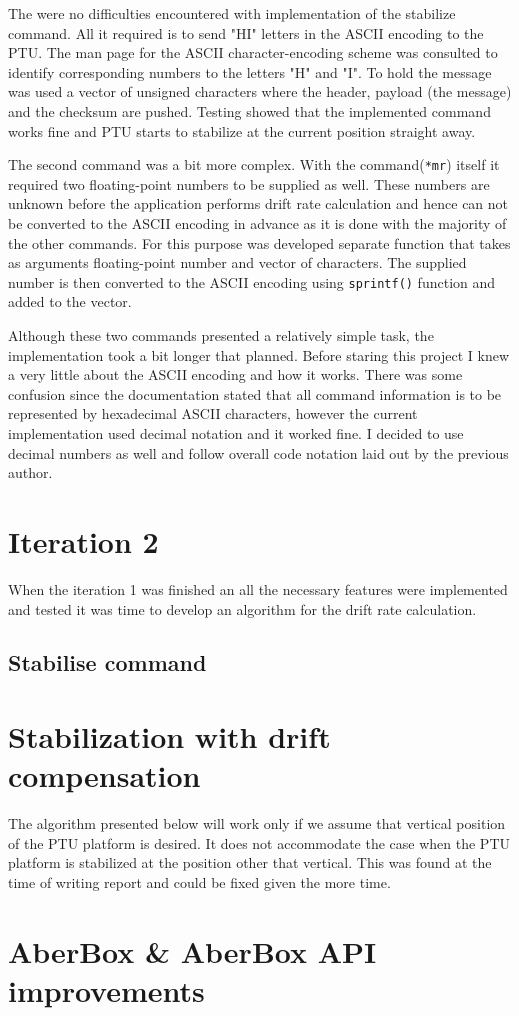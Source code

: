 The were no difficulties encountered with implementation of the stabilize command. All it required is to send "HI" letters in the ASCII encoding to the PTU. The man page for the ASCII character-encoding scheme was consulted to identify corresponding numbers to the letters "H" and "I". To hold the message was used a vector of unsigned characters where the header, payload (the message) and the checksum are pushed. Testing showed that the implemented command works fine and PTU starts to stabilize at the current position straight away. 

The second command was a bit more complex. With the command(\texttt{*mr}) itself it required two floating-point numbers to be supplied as well. These numbers are unknown before the application performs drift rate calculation and hence can not be converted to the ASCII encoding in advance as it is done with the majority of the other commands. For this purpose was developed separate function that takes as arguments floating-point number and vector of characters. The supplied number is then converted to the ASCII encoding using \texttt{sprintf()} function and added to the vector. 

Although these two commands presented a relatively simple task, the implementation took a bit longer that planned. Before staring this project I knew a very little about the ASCII encoding and how it works. There was some confusion since the documentation stated that all command information is to be represented by hexadecimal ASCII characters, however the current implementation used decimal notation and it worked fine. I decided to use decimal numbers as well and follow overall code notation laid out by the previous author.   
 
\section{Iteration 2}
When the iteration 1 was finished an all the necessary features were implemented and tested it was time to develop an algorithm for the drift rate calculation.
\subsection{Stabilise command}
\label{stabilize_implementation}
 
 
 
 \section{Stabilization with drift compensation}
 
 The algorithm presented below will work only if we assume that vertical position of the PTU platform is desired. It does not accommodate the case when the PTU  platform is stabilized at the position other that vertical. This was found at the time of writing report and could be fixed given the more time.
 
 \section{AberBox \& AberBox API improvements}
